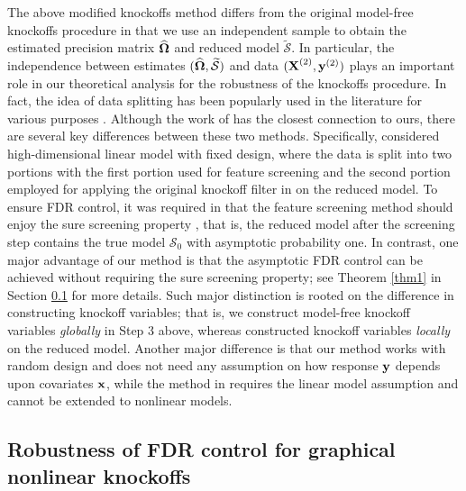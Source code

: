 \documentclass[11pt]{article}
\newcommand{\bx}{\mbox{\bf x}}
\newcommand{\by}{\mbox{\bf y}}
\newcommand{\bX}{\mbox{\bf X}}
\newcommand{\bOmg}{\mbox{\boldmath $\Omega$}}
\newcommand{\wt}{\widetilde}
\newcommand{\wh}{\widehat}
\begin{document}
The above modified knockoffs method differs from the original model-free knockoffs procedure \cite{CandesFanJansonLv2016} in that we use an independent sample to obtain the estimated precision matrix $\wh{\bOmg}$ and reduced model $\wt{\mathcal{S}}$. In particular, the independence between estimates $(\wh{\bOmg}, \wt{\mathcal{S}})$ and data $(\bX^{(2)}, \by^{(2)})$ plays an important role in our theoretical analysis for the robustness of the knockoffs procedure. In fact, the idea of data splitting has been popularly used in the literature for various purposes \cite{FanSamworthWu2009, FanGuoHao2012, ShahSamworth2013, BarberCandes2016}. Although the work of \cite{BarberCandes2016} has the closest connection to ours, there are several key differences between these two methods. Specifically, \cite{BarberCandes2016} considered high-dimensional linear model with fixed design, where the data is split into two portions with the first portion used for feature screening and the second portion employed for applying the original knockoff filter in \cite{BarberCandes2015} on the reduced model. To ensure FDR control, it was required in \cite{BarberCandes2016} that the feature screening method should enjoy the sure screening property \cite{FanLv2008}, that is, the reduced model after the screening step contains the true model $\mathcal{S}_0$ with asymptotic probability one. In contrast, one major advantage of our method is that the asymptotic FDR control can be achieved without requiring the sure screening property; see Theorem \ref{thm1} in Section \ref{sec: 2.2} for more details.  Such major distinction is rooted on the difference in constructing knockoff variables; that is, we construct model-free knockoff variables \textit{globally} in Step 3 above, whereas \cite{BarberCandes2016} constructed knockoff variables \textit{locally} on the reduced model. Another major difference is that our method works with random design and does not need any assumption on how response $\by$ depends upon covariates $\bx$, while the method in \cite{BarberCandes2016} requires the linear model assumption and cannot be extended to nonlinear models.


\subsection{Robustness of FDR control for graphical nonlinear knockoffs} \label{sec: 2.2}
\end{document}
